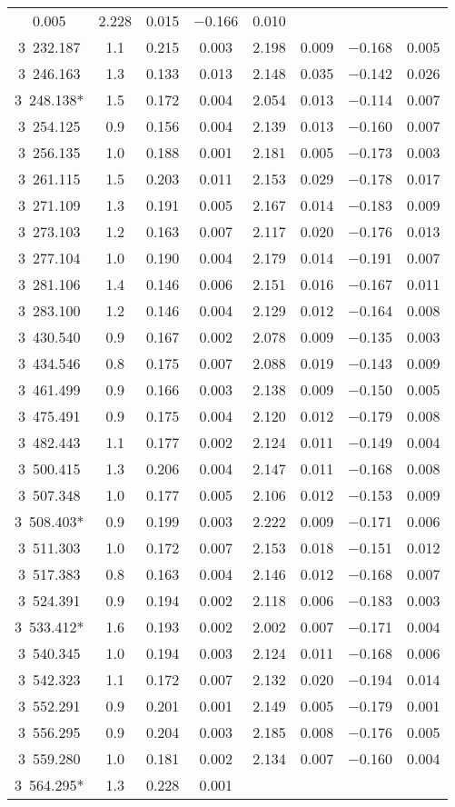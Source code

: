 \begin{table}
\begin{tabular}{cccccccc}
0.005 & 2.228 & 0.015 & $-$0.166 & 0.010 \\ 3~232.187 & 1.1 & 0.215 & 0.003 & 2.198 & 0.009 & $-$0.168 & 0.005 \\ 3~246.163 & 1.3 & 0.133 & 0.013 & 2.148 & 0.035 & $-$0.142 & 0.026 \\ 3~248.138* & 1.5 & 0.172 & 0.004 & 2.054 & 0.013 & $-$0.114 & 0.007 \\ 3~254.125 & 0.9 & 0.156 & 0.004 & 2.139 & 0.013 & $-$0.160 & 0.007 \\ 3~256.135 & 1.0 & 0.188 & 0.001 & 2.181 & 0.005 & $-$0.173 & 0.003 \\ 3~261.115 & 1.5 & 0.203 & 0.011 & 2.153 & 0.029 & $-$0.178 & 0.017 \\ 3~271.109 & 1.3 & 0.191 & 0.005 & 2.167 & 0.014 & $-$0.183 & 0.009 \\ 3~273.103 & 1.2 & 0.163 & 0.007 & 2.117 & 0.020 & $-$0.176 & 0.013 \\ 3~277.104 & 1.0 & 0.190 & 0.004 & 2.179 & 0.014 & $-$0.191 & 0.007 \\ 3~281.106 & 1.4 & 0.146 & 0.006 & 2.151 & 0.016 & $-$0.167 & 0.011 \\ 3~283.100 & 1.2 & 0.146 & 0.004 & 2.129 & 0.012 & $-$0.164 & 0.008 \\ 3~430.540 & 0.9 & 0.167 & 0.002 & 2.078 & 0.009 & $-$0.135 & 0.003 \\ 3~434.546 & 0.8 & 0.175 & 0.007 & 2.088 & 0.019 & $-$0.143 & 0.009 \\ 3~461.499 & 0.9 & 0.166 & 0.003 & 2.138 & 0.009 & $-$0.150 & 0.005 \\ 3~475.491 & 0.9 & 0.175 & 0.004 & 2.120 & 0.012 & $-$0.179 & 0.008 \\ 3~482.443 & 1.1 & 0.177 & 0.002 & 2.124 & 0.011 & $-$0.149 & 0.004 \\ 3~500.415 & 1.3 & 0.206 & 0.004 & 2.147 & 0.011 & $-$0.168 & 0.008 \\ 3~507.348 & 1.0 & 0.177 & 0.005 & 2.106 & 0.012 & $-$0.153 & 0.009 \\ 3~508.403* & 0.9 & 0.199 & 0.003 & 2.222 & 0.009 & $-$0.171 & 0.006 \\ 3~511.303 & 1.0 & 0.172 & 0.007 & 2.153 & 0.018 & $-$0.151 & 0.012 \\ 3~517.383 & 0.8 & 0.163 & 0.004 & 2.146 & 0.012 & $-$0.168 & 0.007 \\ 3~524.391 & 0.9 & 0.194 & 0.002 & 2.118 & 0.006 & $-$0.183 & 0.003 \\ 3~533.412* & 1.6 & 0.193 & 0.002 & 2.002 & 0.007 & $-$0.171 & 0.004 \\ 3~540.345 & 1.0 & 0.194 & 0.003 & 2.124 & 0.011 & $-$0.168 & 0.006 \\ 3~542.323 & 1.1 & 0.172 & 0.007 & 2.132 & 0.020 & $-$0.194 & 0.014 \\ 3~552.291 & 0.9 & 0.201 & 0.001 & 2.149 & 0.005 & $-$0.179 & 0.001 \\ 3~556.295 & 0.9 & 0.204 & 0.003 & 2.185 & 0.008 & $-$0.176 & 0.005 \\ 3~559.280 & 1.0 & 0.181 & 0.002 & 2.134 & 0.007 & $-$0.160 & 0.004 \\ 3~564.295* & 1.3 & 0.228 & 0.001 & 
\end{tabular}
\end{table}
